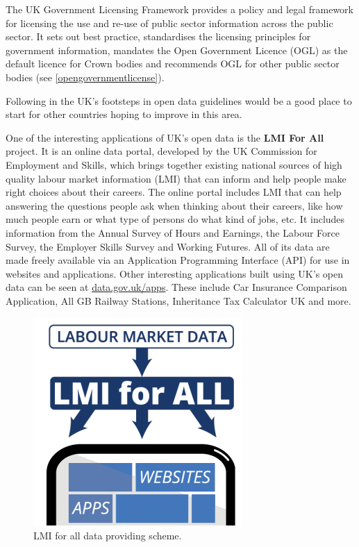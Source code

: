 \documentclass[thesis=B,english]{FITthesis}[2012/06/26]
\begin{document}
The UK Government Licensing Framework provides a policy and legal framework for licensing the use and re-use of public sector information across the public sector. It sets out best practice, standardises the licensing principles for government information, mandates the Open Government Licence (OGL) as the default licence for Crown bodies and recommends OGL for other public sector bodies (see \ref{opengovernmentlicense}).

Following in the UK’s footsteps in open data guidelines would be a good place to start for other countries hoping to improve in this area.\cite{UKopendatagov}

One of the interesting applications of UK's open data is the \textbf{LMI For All} project. It is an online data portal, developed by the UK Commission for Employment and Skills, which brings together existing national sources of high quality labour market information (LMI) that can inform and help people make right choices about their careers. The online portal includes LMI that can help answering the questions people ask when thinking about their careers, like how much people earn or what type of persons do what kind of jobs, etc. It includes information from the Annual Survey of Hours and Earnings, the Labour Force Survey, the Employer Skills Survey and Working Futures. All of its data are made freely available  via an Application Programming Interface (API) for use in websites and applications. \linebreak
Other interesting applications built using UK's open data can be seen at \href{https://data.gov.uk/apps}{data.gov.uk/apps}. These include Car Insurance Comparison Application, All GB Railway Stations, Inheritance Tax Calculator UK and more.
	\begin{figure}[h!]
		\centering
		\includegraphics[scale=0.5]{pictures/LMIForAll.png}
  		\caption{LMI for all data providing scheme. \cite{lmiforall}}
  		\label{fig:LMI for all}
	\end{figure}
\end{document}
